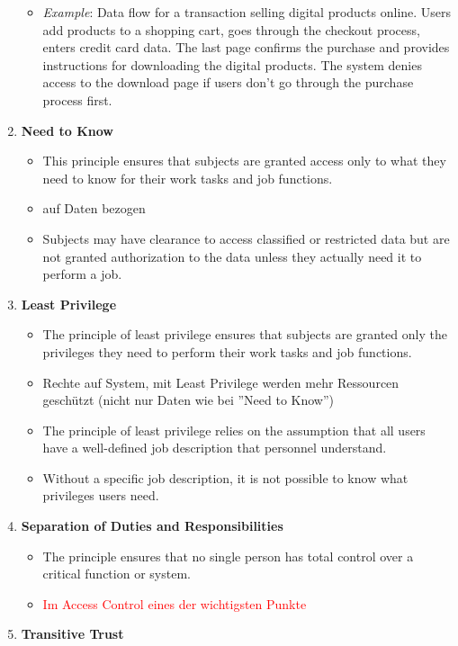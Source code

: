 \begin{enumerate}
\begin{itemize}
        \item \textit{Example}: Data flow for a transaction selling digital products online. Users add products to a shopping cart, goes through the checkout process, enters credit card data. The last page confirms the purchase and provides instructions for downloading the digital products. The system denies access to the download page if users don't go through the purchase process first.
    \end{itemize}
    \item \textbf{Need to Know}
    \begin{itemize}
        \item This principle ensures that subjects are granted access only to what they need to know for their work tasks and job functions.
        \item auf Daten bezogen
        \item Subjects may have clearance to access classified or restricted data but are not granted authorization to the data unless they actually need it to perform a job.
    \end{itemize}
    \item \textbf{Least Privilege}
    \begin{itemize}
        \item The principle of least privilege ensures that subjects are granted only the privileges they need to perform their work tasks and job functions.
        \item Rechte auf System, mit Least Privilege werden mehr Ressourcen geschützt (nicht nur Daten wie bei ''Need to Know'')
        \item The principle of least privilege relies on the assumption that all users have a well-defined job description that personnel understand.
        \item Without a specific job description, it is not possible to know what privileges users need.
    \end{itemize}
    \item \textbf{Separation of Duties and Responsibilities}
    \begin{itemize}
        \item The principle ensures that no single person has total control over a critical function or system.
        \item \textcolor{red}{Im Access Control eines der wichtigsten Punkte}
    \end{itemize}
    \item \textbf{Transitive Trust}

\end{enumerate}
